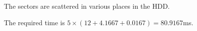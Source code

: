 \documentclass[answers]{exam}
\begin{document}
\begin{questions}
\begin{parts}
\begin{subparts}
            \subpart The sectors are scattered in various places in the HDD.
            \begin{solution}
                The required time is $5 \times (12 + 4.1667 + 0.0167) = 80.9167$ms.
            \end{solution}
        \end{subparts}
    \end{parts}

\end{questions}
\end{document}
